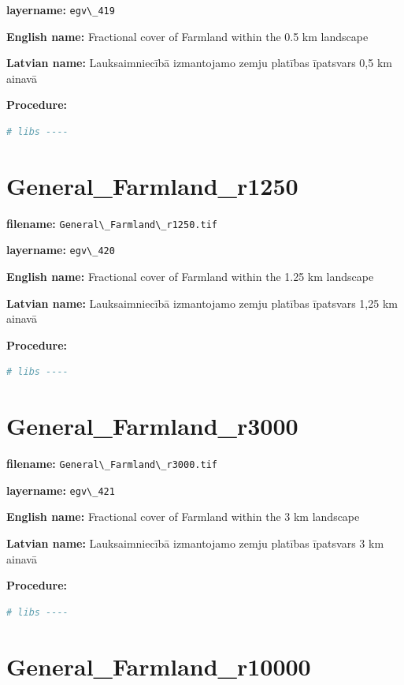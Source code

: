 \documentclass[
]{book}
\newcommand{\passthrough}[1]{#1}
\begin{document}
\textbf{layername:} \passthrough{\lstinline!egv\_419!}

\textbf{English name:} Fractional cover of Farmland within the 0.5 km landscape

\textbf{Latvian name:} Lauksaimniecībā izmantojamo zemju platības īpatsvars 0,5 km ainavā

\textbf{Procedure:}

\begin{lstlisting}[language=R]
# libs ----
\end{lstlisting}

\section{General\_Farmland\_r1250}\label{ch06.420}

\textbf{filename:} \passthrough{\lstinline!General\_Farmland\_r1250.tif!}

\textbf{layername:} \passthrough{\lstinline!egv\_420!}

\textbf{English name:} Fractional cover of Farmland within the 1.25 km landscape

\textbf{Latvian name:} Lauksaimniecībā izmantojamo zemju platības īpatsvars 1,25 km ainavā

\textbf{Procedure:}

\begin{lstlisting}[language=R]
# libs ----
\end{lstlisting}

\section{General\_Farmland\_r3000}\label{ch06.421}

\textbf{filename:} \passthrough{\lstinline!General\_Farmland\_r3000.tif!}

\textbf{layername:} \passthrough{\lstinline!egv\_421!}

\textbf{English name:} Fractional cover of Farmland within the 3 km landscape

\textbf{Latvian name:} Lauksaimniecībā izmantojamo zemju platības īpatsvars 3 km ainavā

\textbf{Procedure:}

\begin{lstlisting}[language=R]
# libs ----
\end{lstlisting}

\section{General\_Farmland\_r10000}\label{ch06.422}
\end{document}
